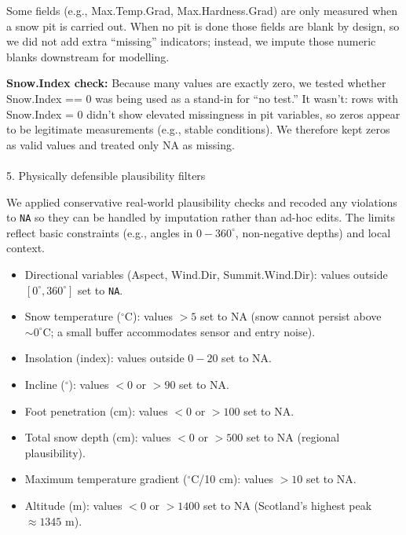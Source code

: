 \documentclass[
  letterpaper,
  DIV=11,
  numbers=noendperiod]{scrartcl}
\makeatletter
\let\oldparagraph\paragraph
\renewcommand{\paragraph}{
    \@ifstar
      \xxxParagraphStar
      \xxxParagraphNoStar
  }
\newcommand{\xxxParagraphStar}[1]{\oldparagraph*{#1}\mbox{}}
\newcommand{\xxxParagraphNoStar}[1]{\oldparagraph{#1}\mbox{}}
\providecommand{\tightlist}{%
  \setlength{\itemsep}{0pt}\setlength{\parskip}{0pt}}\usepackage{longtable,booktabs,array}
\makeatother
\begin{document}
Some fields (e.g., Max.Temp.Grad, Max.Hardness.Grad) are only measured
when a snow pit is carried out. When no pit is done those fields are
blank by design, so we did not add extra ``missing'' indicators;
instead, we impute those numeric blanks downstream for modelling.

\textbf{Snow.Index check:} Because many values are exactly zero, we
tested whether Snow.Index == 0 was being used as a stand-in for ``no
test.'' It wasn't: rows with Snow.Index = 0 didn't show elevated
missingness in pit variables, so zeros appear to be legitimate
measurements (e.g., stable conditions). We therefore kept zeros as valid
values and treated only NA as missing.

\paragraph{5. Physically defensible plausibility
filters}\label{physically-defensible-plausibility-filters}

We applied conservative real-world plausibility checks and recoded any
violations to \texttt{NA} so they can be handled by imputation rather
than ad-hoc edits. The limits reflect basic constraints (e.g., angles in
\(0{-}360^\circ\), non-negative depths) and local context.

\begin{itemize}
\tightlist
\item
  Directional variables (Aspect, Wind.Dir, Summit.Wind.Dir): values
  outside \([0^\circ, 360^\circ]\) set to \texttt{NA}.\\
\item
  Snow temperature (\(^\circ\)C): values \(> 5\) set to NA (snow cannot
  persist above \(\sim 0^\circ\)C; a small buffer accommodates sensor
  and entry noise).\\
\item
  Insolation (index): values outside \(0{-}20\) set to NA.\\
\item
  Incline (\(^\circ\)): values \(<0\) or \(>90\) set to NA.\\
\item
  Foot penetration (cm): values \(<0\) or \(>100\) set to NA.\\
\item
  Total snow depth (cm): values \(<0\) or \(>500\) set to NA (regional
  plausibility).\\
\item
  Maximum temperature gradient (\(^\circ\)C/10 cm): values \(> 10\) set
  to NA.\\
\item
  Altitude (m): values \(<0\) or \(>1400\) set to NA (Scotland's highest
  peak \(\approx 1345\) m).
\end{itemize}
\end{document}
